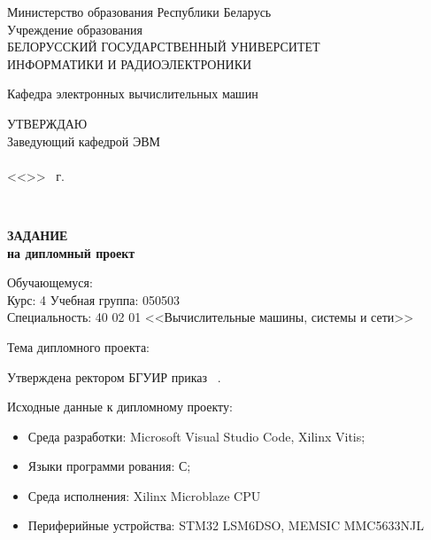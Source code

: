     \begin{center}
      Министерство образования Республики Беларусь\\[1em]
      Учреждение образования\\
      БЕЛОРУССКИЙ ГОСУДАРСТВЕННЫЙ УНИВЕРСИТЕТ \\
      ИНФОРМАТИКИ И РАДИОЭЛЕКТРОНИКИ\\[1em]
    \end{center}

    \begin{center}
      Кафедра электронных вычислительных машин
    \end{center}

    \begin{flushright}
      \begin{minipage}{0.4\textwidth}
        \MakeUppercase{Утверждаю}\\
        Заведующий кафедрой ЭВМ\\
        \underline{\hspace*{2.2cm}} \headOfDepartmentShort \\
        <<\underline{\hspace*{1cm}}>> \underline{\hspace*{2.5cm}} \targetYear\ г.
      \end{minipage}\\[1em]
    \end{flushright}

    \begin{center}
      \textbf{ЗАДАНИЕ}\\
      \textbf{на дипломный проект}\\[1em]
    \end{center}

    \noindent
    Обучающемуся: \studentFullTask \\
    Курс: 4 \hspace*{2ex} Учебная группа: 050503 \\
    Специальность: 40 02 01 <<Вычислительные машины, системы и сети>>

    \vspace{1em}
    \noindent
    Тема дипломного проекта: \taskNameFull

    \vspace{1em}
    \noindent
    Утверждена ректором БГУИР \uniDecreeDate приказ \textnumero \ \uniDecreeNumber.

    \vspace{1em}
    \noindent
    Исходные данные к дипломному проекту:
    \begin{itemize}[label={}, itemindent=\parindent]
      \item Среда разработки: Microsoft Visual Studio Code, Xilinx Vitis;
      \item Языки программи рования: С;
      \item Среда исполнения: Xilinx Microblaze CPU
      \item Периферийные устройства: STM32 LSM6DSO, MEMSIC MMC5633NJL
    \end{itemize}

